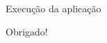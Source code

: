 \documentclass[12pt]{beamer}
\begin{document}
\begin{frame}

\begin{center}
\Huge Execução da aplicação
\end{center}

\end{frame}

\begin{frame}

\begin{center}
\Huge Obrigado!
\end{center}

\end{frame}
\end{document}
